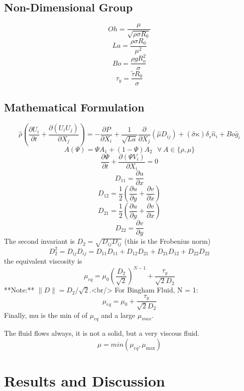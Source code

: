 \documentclass{jfm}
\begin{document}
\subsection{Non-Dimensional Group}\label{sec:Numbers}
$$Oh = \frac{\mu}{\sqrt{\rho\sigma R_0}}$$
$$La = \frac{\rho\sigma R_0}{\mu^2}$$
$$Bo = \frac{\rho gR_o^2}{\sigma}$$
$$\tau_y = \frac{\tilde{\tau}R_0}{\sigma}$$
\lipsum[1]
\subsection{Mathematical Formulation}
\begin{equation}
\hat{\rho}\left(\frac{\partial U_i}{\partial t} + \frac{\partial\left(U_iU_j\right)}{\partial X_j}\right) = -\frac{\partial P}{\partial X_i} + \frac{1}{\sqrt{La}}\frac{\partial}{\partial X_j}\left(\hat{\mu}D_{ij}\right) + \left(\hat{\sigma}\kappa\right)\delta_s\hat{n}_{i} + Bo\hat{g}_i
\end{equation}
\begin{equation} \label{Equation::general}
A (\Psi) = \Psi A_1 + (1-\Psi)A_2 \: \: \:  \forall  \: A \in \{\rho, \mu\}
\end{equation}
\begin{equation} \label{Equation::vof}
\frac{\partial \Psi}{\partial t} + \frac{\partial(\Psi V_i)}{\partial X_i} = 0
\end{equation}
$$D_{11} = \frac{\partial u}{\partial x}$$
$$D_{12} = \frac{1}{2}\left( \frac{\partial u}{\partial y}+ \frac{\partial v}{\partial x}\right)$$
$$D_{21} = \frac{1}{2}\left( \frac{\partial u}{\partial y}+ \frac{\partial v}{\partial x}\right)$$
$$D_{22} = \frac{\partial v}{\partial y}$$
The second invariant is $D_2=\sqrt{D_{ij}D_{ij}}$ (this is the Frobenius norm)
$$D_2^2= D_{ij}D_{ij}= D_{11}D_{11} + D_{12}D_{21} + D_{21}D_{12} + D_{22}D_{22}$$
the equivalent viscosity is
$$\mu_{eq}= \mu_0\left(\frac{D_2}{\sqrt{2}}\right)^{N-1} + \frac{\tau_y}{\sqrt{2} D_2 }$$
**Note:** $\|D\| = D_2/\sqrt{2}$.<br/>
For Bingham Fluid, N = 1:
$$\mu_{eq}= \mu_0 + \frac{\tau_y}{\sqrt{2} D_2 }$$
Finally, mu is the min of of $\mu_{eq}$ and a large $\mu_{max}$.

The fluid flows always, it is not a solid, but a very viscous fluid.
$$ \mu = min\left(\mu_{eq}, \mu_{\mbox{max}}\right) $$
\section{Results and Discussion}
\end{document}
